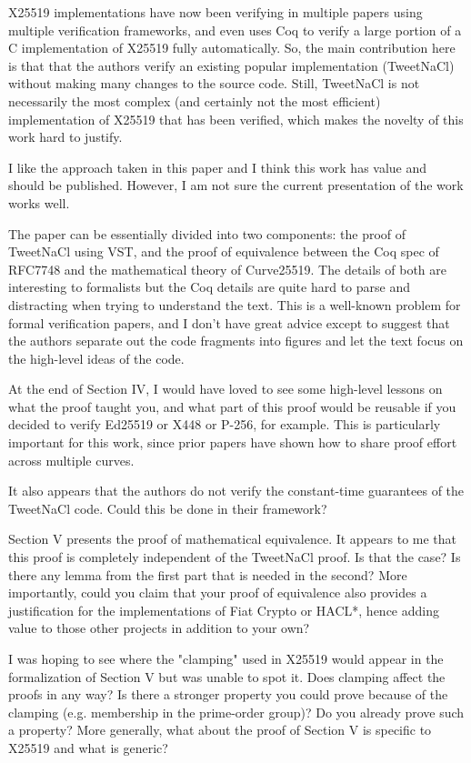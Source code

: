 \begin{center}
\end{center}

X25519 implementations have now been verifying in multiple papers using multiple
verification frameworks, and \cite{Erbsen2016SystematicSO} even uses Coq to
verify a large portion of a C implementation of X25519 fully automatically.
So, the main contribution here is that that the authors verify an existing
popular implementation (TweetNaCl) without making many changes to the source
code. Still, TweetNaCl is not necessarily the most complex (and certainly not
the most efficient) implementation of X25519 that has been verified, which
makes the novelty of this work hard to justify.


\begin{center}
\end{center}

I like the approach taken in this paper and I think this work has value and
should be published.
However, I am not sure the current presentation of the work works well.

The paper can be essentially divided into two components: the proof of TweetNaCl
using VST, and the proof of equivalence between the Coq spec of RFC7748 and the
mathematical theory of Curve25519.  The details of both are interesting to
formalists but the Coq details are quite hard to parse and distracting when
trying to understand the text. This is a well-known problem for formal
verification papers, and I don't have great advice except to suggest that the
authors separate out the code fragments into figures and let the text focus
on the high-level ideas of the code.

At the end of Section IV, I would have loved to see some high-level lessons on
what the proof taught you, and what part of this proof would be reusable if you
decided to verify Ed25519 or X448 or P-256, for example. This is particularly
important for this work, since prior papers have shown how to share proof effort
across multiple curves.

It also appears that the authors do not verify the constant-time guarantees of
the TweetNaCl code. Could this be done in their framework?

Section V presents the proof of mathematical equivalence. It appears to me that
this proof is completely independent of the TweetNaCl proof. Is that the case?
Is there any lemma from the first part that is needed in the second? More
importantly, could you claim that your proof of equivalence also provides a
justification for the implementations of Fiat Crypto or HACL*, hence adding
value to those other projects in addition to your own?

I was hoping to see where the "clamping" used in X25519 would appear in the
formalization of Section V but was unable to spot it. Does clamping affect the
proofs in any way? Is there a stronger property you could prove because of the
clamping (e.g. membership in the prime-order group)?
Do you already prove such a property?  More generally, what about the proof of
Section V is specific to X25519 and what is generic?

